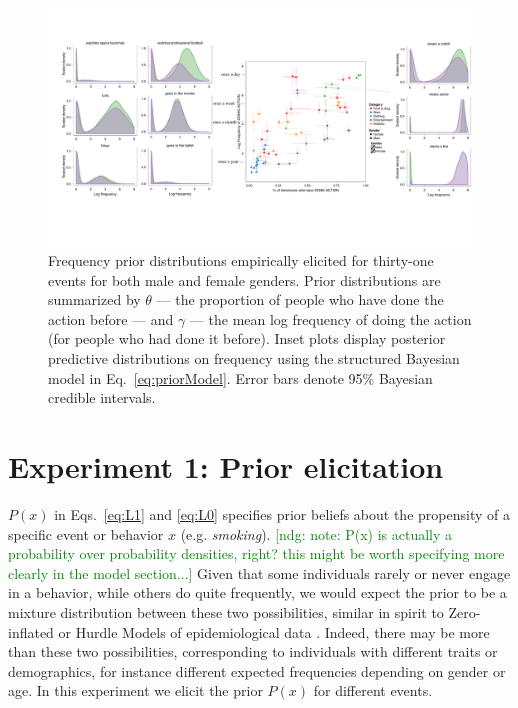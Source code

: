 \documentclass[10pt,letterpaper]{article}
\newcommand{\ndg}[1]{\textcolor{Green}{[ndg: #1]}}
\begin{document}
\begin{figure}[t]
\centering
  \includegraphics[width=\textwidth]{prior-scatter-insets}
  \caption{Frequency prior distributions empirically elicited for thirty-one events for both male and female genders. Prior distributions are summarized by $\theta$ --- the proportion of people who have done the action before --- and $\gamma$ --- the mean log frequency of doing the action (for people who had done it before).  Inset plots display posterior predictive distributions on frequency using the structured Bayesian model in Eq.~\ref{eq:priorModel}. Error bars denote 95\% Bayesian credible intervals.}
  \label{fig:priorScatter}
\end{figure}
%


\section{Experiment 1: Prior elicitation}

%
$P(x)$ in Eqs.~\ref{eq:L1} and \ref{eq:L0} specifies prior beliefs about the propensity of a specific event or behavior $x$  (e.g. \emph{smoking}).
\ndg{note: P(x) is actually a probability over probability densities, right? this might be worth specifying more clearly in the model section...}
Given that some individuals rarely or never engage in a behavior, while others do quite frequently, we would expect the prior to be a mixture distribution between these two possibilities, similar in spirit to Zero-inflated or Hurdle Models of epidemiological data \cite{hurdleModels}.
Indeed, there may be more than these two possibilities, corresponding to individuals with different traits or demographics, for instance different expected frequencies depending on gender or age. 
In this experiment we elicit the prior $P(x)$ for different events.
\end{document}
